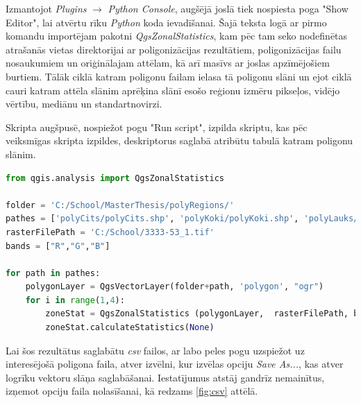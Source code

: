 \documentclass[12pt,paper=a4]{report}
\begin{document}
Izmantojot \textit{Plugins} $\rightarrow$ \textit{Python Console}, augšējā joslā tiek nospiesta poga "Show Editor", lai atvērtu rīku \textit{Python} koda ievadīšanai. Šajā teksta logā ar pirmo komandu importējam pakotni \textit{QgsZonalStatistics}, kam pēc tam seko nodefinētas atrašanās vietas direktorijai ar poligonizācijas rezultātiem, poligonizācijas failu nosaukumiem un oriģinālajam attēlam, kā arī masīvs ar joslas apzīmējošiem burtiem. Tālāk ciklā katram poligonu failam ielasa tā poligonu slāni un ejot ciklā cauri katram attēla slānim aprēķina slānī esošo reģionu izmēru pikseļos, vidējo vērtību, mediānu un standartnovirzi.\par
Skripta augšpusē, nospiežot pogu "Run script", izpilda skriptu, kas pēc veiksmīgas skripta izpildes, deskriptorus saglabā atribūtu tabulā katram poligonu slānim.
\begin{lstlisting}[language=Python]
from qgis.analysis import QgsZonalStatistics

folder = 'C:/School/MasterThesis/polyRegions/'
pathes = ['polyCits/polyCits.shp', 'polyKoki/polyKoki.shp', 'polyLauks/polyLauks.shp', 'polyUdens/polyUdens.shp', 'polyZaliens/polyZaliens.shp',  'polyViss/polyViss.shp']
rasterFilePath = 'C:/School/3333-53_1.tif'
bands = ["R","G","B"]

for path in pathes:
    polygonLayer = QgsVectorLayer(folder+path, 'polygon', "ogr") 
    for i in range(1,4):
        zoneStat = QgsZonalStatistics (polygonLayer,  rasterFilePath, bands[i-1], i, QgsZonalStatistics.Count  | QgsZonalStatistics.Mean | QgsZonalStatistics.Median | QgsZonalStatistics.StDev)
        zoneStat.calculateStatistics(None)
\end{lstlisting}
Lai šos rezultātus saglabātu \textit{csv} failos, ar labo peles pogu uzspiežot uz interesējošā poligona faila, atver izvēlni, kur izvēlas opciju \textit{Save As...}, kas atver logrīku vektoru slāņa saglabāšanai. Iestatījumus atstāj gandrīz nemainītus, izņemot opciju faila nolasīšanai, kā redzams \ref{fig:csv} attēlā.
\end{document}
